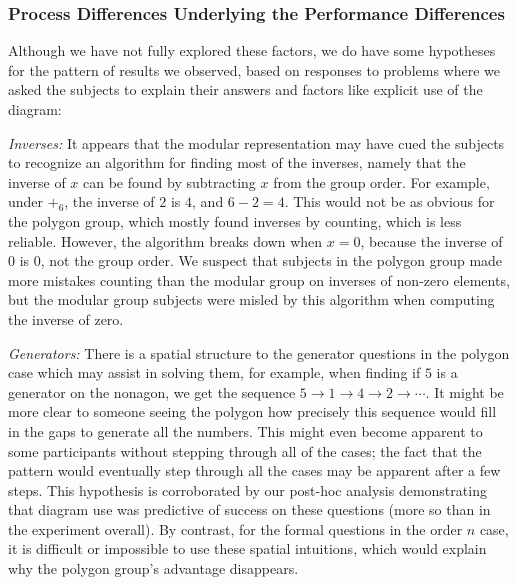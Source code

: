 \documentclass[man,10pt]{apa6}
\begin{document}
\subsubsection{Process Differences Underlying the Performance Differences}
Although we have not fully explored these factors, we do have some hypotheses for the pattern of results we observed, based on responses to problems where we asked the subjects to explain their answers and factors like explicit use of the diagram:\par 
\textit{Inverses:} It appears that the modular representation may have cued the subjects to recognize an algorithm for finding most of the inverses, namely that the inverse of $x$ can be found by subtracting $x$ from the group order. For example, under $+_6$, the inverse of $2$ is $4$, and $6-2 = 4$. This would not be as obvious for the polygon group, which mostly found inverses by counting, which is less reliable. However, the algorithm breaks down when $x = 0$, because the inverse of $0$ is $0$, not the group order. We suspect that subjects in the polygon group made more mistakes counting than the modular group on inverses of non-zero elements, but the modular group subjects were misled by this algorithm when computing the inverse of zero. \par
\textit{Generators:} There is a spatial structure to the generator questions in the polygon case which may assist in solving them, for example, when finding if $5$ is a generator on the nonagon, we get the sequence $5 \rightarrow 1 \rightarrow 4 \rightarrow 2 \rightarrow \cdots$. It might be more clear to someone seeing the polygon how precisely this sequence would fill in the gaps to generate all the numbers. This might even become apparent to some participants without stepping through all of the cases;  the fact that the pattern would eventually step through all the cases may be apparent after a few steps. This hypothesis is corroborated by our post-hoc analysis demonstrating that diagram use was predictive of success on these questions (more so than in the experiment overall). By contrast, for the formal questions in the order $n$ case, it is difficult or impossible to use these spatial intuitions, which would explain why the polygon group's advantage disappears.
\end{document}
